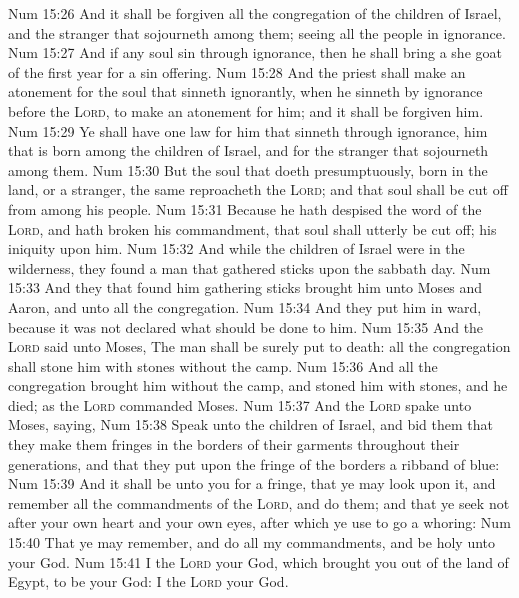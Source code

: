 \vs Num 15:26 And it shall be forgiven all the congregation of the children of Israel, and the stranger that sojourneth among them; seeing all the people  in ignorance.
\vs Num 15:27 And if any soul sin through ignorance, then he shall bring a she goat of the first year for a sin offering.
\vs Num 15:28 And the priest shall make an atonement for the soul that sinneth ignorantly, when he sinneth by ignorance before the \textsc{Lord}, to make an atonement for him; and it shall be forgiven him.
\vs Num 15:29 Ye shall have one law for him that sinneth through ignorance,  him that is born among the children of Israel, and for the stranger that sojourneth among them.
\vs Num 15:30 But the soul that doeth  presumptuously,  born in the land, or a stranger, the same reproacheth the \textsc{Lord}; and that soul shall be cut off from among his people.
\vs Num 15:31 Because he hath despised the word of the \textsc{Lord}, and hath broken his commandment, that soul shall utterly be cut off; his iniquity  upon him.
\vs Num 15:32 And while the children of Israel were in the wilderness, they found a man that gathered sticks upon the sabbath day.
\vs Num 15:33 And they that found him gathering sticks brought him unto Moses and Aaron, and unto all the congregation.
\vs Num 15:34 And they put him in ward, because it was not declared what should be done to him.
\vs Num 15:35 And the \textsc{Lord} said unto Moses, The man shall be surely put to death: all the congregation shall stone him with stones without the camp.
\vs Num 15:36 And all the congregation brought him without the camp, and stoned him with stones, and he died; as the \textsc{Lord} commanded Moses.
\vs Num 15:37 And the \textsc{Lord} spake unto Moses, saying,
\vs Num 15:38 Speak unto the children of Israel, and bid them that they make them fringes in the borders of their garments throughout their generations, and that they put upon the fringe of the borders a ribband of blue:
\vs Num 15:39 And it shall be unto you for a fringe, that ye may look upon it, and remember all the commandments of the \textsc{Lord}, and do them; and that ye seek not after your own heart and your own eyes, after which ye use to go a whoring:
\vs Num 15:40 That ye may remember, and do all my commandments, and be holy unto your God.
\vs Num 15:41 I  the \textsc{Lord} your God, which brought you out of the land of Egypt, to be your God: I  the \textsc{Lord} your God.
